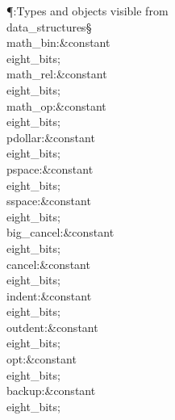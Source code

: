 \Y\P\?\4:Types and objects visible from \\{data\_structures}\X\mathrel{+}\S%
\?\6
\\{math\_bin}\?:\?\&{constant}\8\\{eight\_bits}\?\K{}\?;\6
\\{math\_rel}\?:\?\&{constant}\8\\{eight\_bits}\?\K{}\?;\6
\\{math\_op}\?:\?\&{constant}\8\\{eight\_bits}\?\K{}\?;\6
\\{pdollar}\?:\?\&{constant}\8\\{eight\_bits}\?\K{}\?;\6
\\{pspace}\?:\?\&{constant}\8\\{eight\_bits}\?\K{}\?;\6
\\{sspace}\?:\?\&{constant}\8\\{eight\_bits}\?\K{}\?;\6
\\{big\_cancel}\?:\?\&{constant}\8\\{eight\_bits}\?\K{}\?;\6
\\{cancel}\?:\?\&{constant}\8\\{eight\_bits}\?\K{}\?;\6
\\{indent}\?:\?\&{constant}\8\\{eight\_bits}\?\K{}\?;\6
\\{outdent}\?:\?\&{constant}\8\\{eight\_bits}\?\K{}\?;\6
\\{opt}\?:\?\&{constant}\8\\{eight\_bits}\?\K{}\?;\6
\\{backup}\?:\?\&{constant}\8\\{eight\_bits}\?\K{}\?;\6
